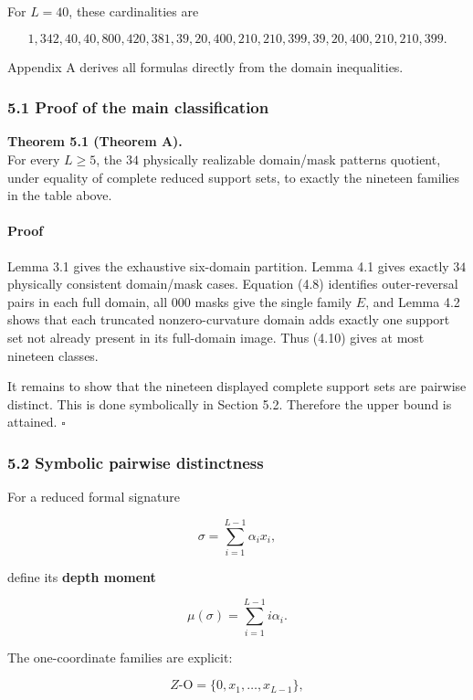 \documentclass[
  british,
  a4paper,
  11pt]{article}
\begin{document}
For \(L=40\), these cardinalities are

\[
1,342,40,40,800,420,381,39,20,400,210,210,399,
39,20,400,210,210,399.
\tag{5.2}
\]

Appendix A derives all formulas directly from the domain inequalities.

\subsubsection{5.1 Proof of the main
classification}\label{proof-of-the-main-classification}

\textbf{Theorem 5.1 (Theorem A).}\\
For every \(L\ge5\), the \(34\) physically realizable domain/mask
patterns quotient, under equality of complete reduced support sets, to
exactly the nineteen families in the table above.

\paragraph{Proof}\label{proof-4}

Lemma 3.1 gives the exhaustive six-domain partition. Lemma 4.1 gives
exactly \(34\) physically consistent domain/mask cases. Equation (4.8)
identifies outer-reversal pairs in each full domain, all \(000\) masks
give the single family \(E\), and Lemma 4.2 shows that each truncated
nonzero-curvature domain adds exactly one support set not already
present in its full-domain image. Thus (4.10) gives at most nineteen
classes.

It remains to show that the nineteen displayed complete support sets are
pairwise distinct. This is done symbolically in Section 5.2. Therefore
the upper bound is attained. \(\square\)

\subsubsection{5.2 Symbolic pairwise
distinctness}\label{symbolic-pairwise-distinctness}

For a reduced formal signature

\[
\sigma=\sum_{i=1}^{L-1}\alpha_i x_i,
\]

define its \textbf{depth moment}

\[
\mu(\sigma)=\sum_{i=1}^{L-1}i\alpha_i.
\tag{5.3}
\]

The one-coordinate families are explicit:

\[
Z\text{-O}=\{0,x_1,\ldots,x_{L-1}\},
\]
\end{document}
